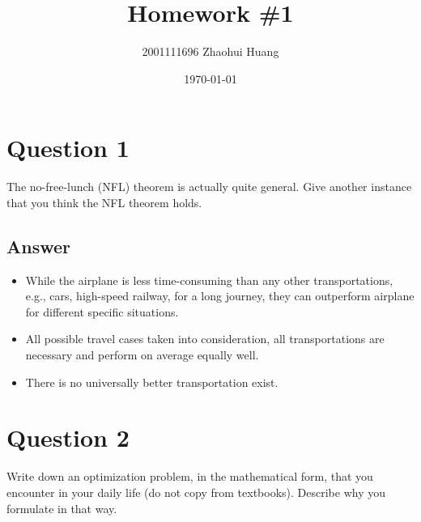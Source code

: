 \documentclass[
	12pt, %
]{fphw}
\title{Homework \#1} %
\author{2001111696 Zhaohui Huang} %
\date{\today} %
\institute{Peking University} %
\begin{document}
\maketitle %


\section*{Question 1}

\begin{problem}
	The no-free-lunch (NFL) theorem is actually quite general. Give another instance that you think the NFL theorem holds.
\end{problem}


\subsection*{Answer}

\begin{itemize}
	\item While the airplane is less time-consuming than any other transportations, e.g., cars, high-speed railway, for a long journey, they can outperform airplane for different specific situations.
	\item All possible travel cases taken into consideration, all transportations are necessary and perform on average equally well.
	\item There is no universally better transportation exist.
\end{itemize}


\section*{Question 2}

\begin{problem}
Write down an optimization problem, in the mathematical form, that you encounter in your daily life (do not copy from textbooks). Describe why you formulate in that way.
\end{problem}
\end{document}
